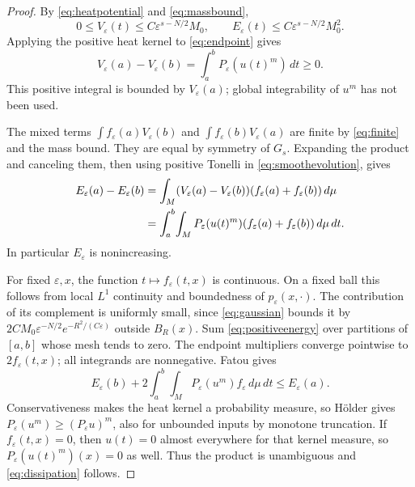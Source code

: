 \documentclass[11pt]{article}
\theoremstyle{definition}
\theoremstyle{remark}
\newcommand{\dd}{\,d\mu}
\newcommand{\intM}{\int_M}
\begin{document}
\begin{proof}
By \eqref{eq:heatpotential} and \eqref{eq:massbound},
\begin{equation}\label{eq:finite}
 0\le V_\varepsilon(t)\le C\varepsilon^{s-N/2}M_0,\qquad
 E_\varepsilon(t)\le C\varepsilon^{s-N/2}M_0^2 .
\end{equation}
Applying the positive heat kernel to \eqref{eq:endpoint} gives
\begin{equation}\label{eq:smoothevolution}
 V_\varepsilon(a)-V_\varepsilon(b)
 =\int_a^bP_\varepsilon(u(t)^m)\,dt\ge0.
\end{equation}
This positive integral is bounded by \(V_\varepsilon(a)\);
global integrability of \(u^m\) has not been used.

The mixed terms
\(\int f_\varepsilon(a)V_\varepsilon(b)\) and
\(\int f_\varepsilon(b)V_\varepsilon(a)\) are finite by
\eqref{eq:finite} and the mass bound. They are equal by
symmetry of \(G_s\). Expanding the product and canceling them,
then using positive Tonelli in \eqref{eq:smoothevolution}, gives
\begin{align}
 E_\varepsilon(a)-E_\varepsilon(b)
 &=\intM(V_\varepsilon(a)-V_\varepsilon(b))
       (f_\varepsilon(a)+f_\varepsilon(b))\dd \notag\\
 &=\int_a^b\!\intM P_\varepsilon(u(t)^m)
       (f_\varepsilon(a)+f_\varepsilon(b))\dd\,dt .       \label{eq:positiveenergy}
\end{align}
In particular \(E_\varepsilon\) is nonincreasing.

For fixed \(\varepsilon,x\), the function
\(t\mapsto f_\varepsilon(t,x)\) is continuous.
On a fixed ball this follows from local \(L^1\) continuity
and boundedness of \(p_\varepsilon(x,\cdot)\).
The contribution of its complement is uniformly small, since
\eqref{eq:gaussian} bounds it by
\(2CM_0\varepsilon^{-N/2}e^{-R^2/(C\varepsilon)}\) outside
\(B_R(x)\).
Sum \eqref{eq:positiveenergy} over partitions of \([a,b]\)
whose mesh tends to zero. The endpoint multipliers converge
pointwise to \(2f_\varepsilon(t,x)\); all integrands are
nonnegative. Fatou gives
\[
 E_\varepsilon(b)+2\int_a^b\!\intM
 P_\varepsilon(u^m)f_\varepsilon\dd\,dt\le E_\varepsilon(a).
\]
Conservativeness makes the heat kernel a probability measure, so
Hölder gives \(P_\varepsilon(u^m)\ge(P_\varepsilon u)^m\),
also for unbounded inputs by monotone truncation.
If \(f_\varepsilon(t,x)=0\), then \(u(t)=0\) almost everywhere
for that kernel measure, so \(P_\varepsilon(u(t)^m)(x)=0\)
as well. Thus the product is unambiguous and
\eqref{eq:dissipation} follows.


\end{proof}
\end{document}
